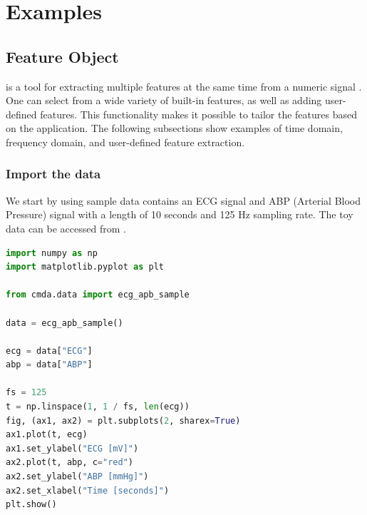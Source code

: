 \documentclass{article}
\begin{document}
\appendix
\section{Examples}\label{sec:appx}



\lstset{style=mystyle}

\subsection{Feature Object} \label{ssec:feature_obj}
 is a tool for extracting multiple features at the same time from a numeric signal . One can select from a wide variety of built-in features, as well as adding user-defined features. This functionality makes it possible to tailor the features based on the application.
The following subsections show examples of time domain, frequency domain, and user-defined feature extraction.

\subsubsection{Import the data}
We start by using sample data contains an ECG signal and ABP (Arterial Blood Pressure) signal with a length of 10 seconds and 125 Hz sampling rate. The toy data can be accessed from .

\begin{lstlisting}[language=Python, caption=Importing a sample data]
import numpy as np
import matplotlib.pyplot as plt

from cmda.data import ecg_apb_sample

data = ecg_apb_sample()

ecg = data["ECG"]
abp = data["ABP"]

fs = 125
t = np.linspace(1, 1 / fs, len(ecg))
fig, (ax1, ax2) = plt.subplots(2, sharex=True)
ax1.plot(t, ecg)
ax1.set_ylabel("ECG [mV]")
ax2.plot(t, abp, c="red")
ax2.set_ylabel("ABP [mmHg]")
ax2.set_xlabel("Time [seconds]")
plt.show()
\end{lstlisting}
\end{document}
